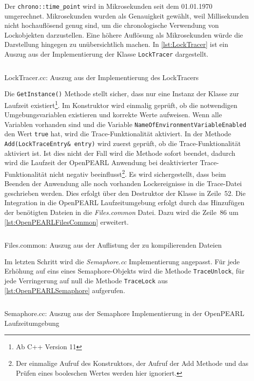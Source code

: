 Der \texttt{chrono::\-time\_point} wird in Mikrosekunden seit dem 01.01.1970
umgerechnet. Mikrosekunden wurden als Genauigkeit gewählt, weil Millisekunden
nicht hochauflösend genug sind, um die chronologische Verwendung von
Lockobjekten darzustellen. Eine höhere Auflösung als Mikrosekunden würde die
Darstellung hingegen zu unübersichtlich machen. In \cref{lst:LockTracer} ist ein
Auszug aus der Implementierung der Klasse \texttt{Lock\-Tracer} dargestellt.
\begin{listing}[ht]
  \inputminted[frame=lines,linenos,firstline=11,lastline=58]{cpp}{./cpp/LockTracer.cc}
  \caption{LockTracer.cc: Auszug aus der Implementierung des LockTracers}
  \label{lst:LockTracer}
\end{listing}
Die \texttt{Get\-Instance()} Methode stellt sicher, dass nur eine Instanz der
Klasse zur Laufzeit existiert\footnote{Ab C++ Version 11}. Im Konstruktor wird
einmalig geprüft, ob die notwendigen Umgebungsvariablen existieren und korrekte
Werte aufweisen. Wenn alle Variablen vorhanden sind und die Variable
\texttt{Name\-Of\-Environment\-Variable\-Enabled} den Wert \texttt{true} hat,
wird die Trace-Funktionalität aktiviert. In der Methode
\texttt{Add(Lock\-Trace\-Entry\& entry)} wird zuerst geprüft, ob die
Trace-Funktionalität aktiviert ist. Ist dies nicht der Fall wird die Methode
sofort beendet, dadurch wird die Laufzeit der OpenPEARL Anwendung bei
deaktivierter Trace-Funktionalität nicht negativ beeinflusst\footnote{Der
einmalige Aufruf des Konstruktors, der Aufruf der Add Methode und das Prüfen
eines booleschen Wertes werden hier ignoriert.}. Es wird sichergestellt, dass
beim Beenden der Anwendung alle noch vorhanden Lockereignisse in die Trace-Datei
geschrieben werden. Dies erfolgt über den Destruktor der Klasse in Zeile~52. Die
Integration in die OpenPEARL Laufzeitumgebung erfolgt durch das Hinzufügen der
benötigten Dateien in die \emph{Files.common} Datei. Dazu wird die Zeile~86 um
\cref{lst:OpenPEARLFilesCommon} erweitert.
\begin{listing}[ht]
  \inputminted[frame=lines,linenos,firstline=86,lastline=88]{bash}{./OpenPEARL/Files.common}
  \caption{Files.common: Auszug aus der Auflistung der zu kompilierenden Dateien}
  \label{lst:OpenPEARLFilesCommon}
\end{listing}
Im letzten Schritt wird die \emph{Semaphore.cc} Implementierung angepasst. Für
jede Erhöhung auf eins eines Semaphore-Objekts wird die Methode
\texttt{Trace\-Unlock}, für jede Verringerung auf null die Methode
\texttt{Trace\-Lock} aus \cref{lst:OpenPEARLSemaphore} aufgerufen.
\begin{listing}[ht]
  \inputminted[frame=lines,linenos,firstline=93,lastline=111]{cpp}{./OpenPEARL/Semaphore.cc}
  \caption{Semaphore.cc: Auszug aus der Semaphore Implementierung in der OpenPEARL Laufzeitumgebung}
  \label{lst:OpenPEARLSemaphore}
\end{listing}

